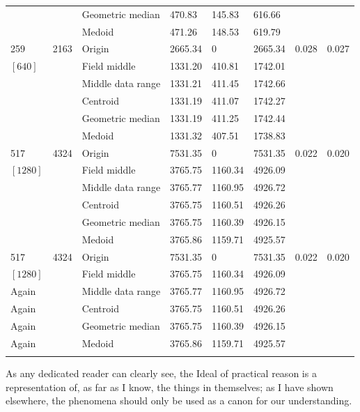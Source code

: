 \documentclass[phd]{ndsu-thesis-2022}
\begin{document}
{{\begin{ThreePartTable}
\begin{longtable}{lll lll ll}
 &  & Geometric median & 470.83 & 145.83 & 616.66 \\
 &  & Medoid  & 471.26 & 148.53 & 619.79 \\
\midrule
259 & 2163 & Origin  & 2665.34 & 0 & 2665.34 & 0.028 & 0.027 \\
$[640]$ &  & Field middle  & 1331.20 & 410.81 & 1742.01 \\
 &  & Middle data range  & 1331.21 & 411.45 & 1742.66 \\
 &  & Centroid & 1331.19 & 411.07 & 1742.27 \\
 &  & Geometric median & 1331.19 & 411.25 & 1742.44 \\
 &  & Medoid  & 1331.32 & 407.51 & 1738.83 \\
\midrule
517 & 4324 & Origin  & 7531.35 & 0 & 7531.35 & 0.022 & 0.020 \\
$[1280]$ &  & Field middle  & 3765.75 & 1160.34 & 4926.09 \\
 &  & Middle data range  & 3765.77 & 1160.95 & 4926.72 \\
 &  & Centroid & 3765.75 & 1160.51 & 4926.26 \\
 &  & Geometric median & 3765.75 & 1160.39 & 4926.15 \\
 &  & Medoid  & 3765.86 & 1159.71 & 4925.57 \\
\midrule
517 & 4324 & Origin  & 7531.35 & 0 & 7531.35 & 0.022 & 0.020 \\
$[1280]$ &  & Field middle  & 3765.75 & 1160.34 & 4926.09 \\
 Again &  & Middle data range  & 3765.77 & 1160.95 & 4926.72 \\
 Again &  & Centroid & 3765.75 & 1160.51 & 4926.26 \\
 Again &  & Geometric median & 3765.75 & 1160.39 & 4926.15 \\
 Again &  & Medoid  & 3765.86 & 1159.71 & 4925.57 \\
 \label{longtab} %
\end{longtable} 
\end{ThreePartTable}
}
}
\setlength{\parindent}{0.5in}
\vspace{-2ex}

As any dedicated reader can clearly see, the Ideal of practical reason is a representation
of, as far as I know, the things in themselves; as I have shown elsewhere, the phenomena
should only be used as a canon for our understanding.


\end{document}
